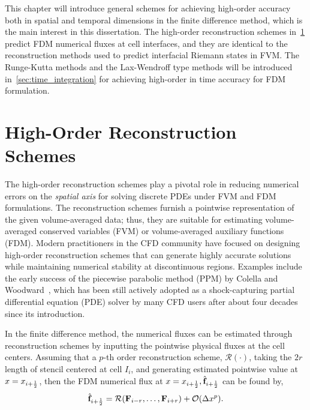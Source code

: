 This chapter will introduce general schemes for achieving high-order accuracy
both in spatial and temporal dimensions in the finite difference method, which is the main interest in this dissertation.
The high-order reconstruction schemes in~\cref{sec:recons} predict FDM numerical fluxes at cell interfaces,
and they are identical to the reconstruction methods used to predict interfacial Riemann states in FVM\@.
The Runge-Kutta methods and the Lax-Wendroff type methods will be introduced in~\cref{sec:time_integration}
for achieving high-order in time accuracy for FDM formulation.


\section{High-Order Reconstruction Schemes}\label{sec:recons}

The high-order reconstruction schemes play a pivotal role in reducing numerical errors
on the \textit{spatial axis} for solving discrete PDEs under FVM and FDM formulations.
The reconstruction schemes furnish a pointwise representation of the given volume-averaged data;
thus, they are suitable for estimating volume-averaged conserved variables (FVM) or
volume-averaged auxiliary functions (FDM).
Modern practitioners in the CFD community have focused on designing high-order reconstruction schemes
that can generate highly accurate solutions while maintaining numerical stability at discontinuous regions.
Examples include the early success of the piecewise parabolic method (PPM) by Colella and Woodward~\cite{colella1984piecewise},
which has been still actively adopted as a shock-capturing partial differential equation (PDE) solver
by many CFD users after about four decades since its introduction.

In the finite difference method, the numerical fluxes can be estimated through reconstruction schemes
by inputting the pointwise physical fluxes at the cell centers.
Assuming that a \( p \)-th order reconstruction scheme, \( \mathcal{R}(\cdot) \), taking the \( 2r \) length of stencil
centered at cell \( I_{i} \), and generating estimated pointwise value at \( x = x_{{i+\frac{1}{2}}} \),
then the FDM numerical flux at \( x = x_{{i+\frac{1}{2}}}, \hat{\mathbf{f}}_{{i+\frac{1}{2}}} \) can be found by,
\begin{equation}\label{eq:fdm_recon_1d}
    \hat{\mathbf{f}}_{{i+\frac{1}{2}}} = \mathcal{R}(\mathbf{F}_{i-r}, \dots, \mathbf{F}_{i+r}) + \mathcal{O}(\Delta x^{p}).
\end{equation}

